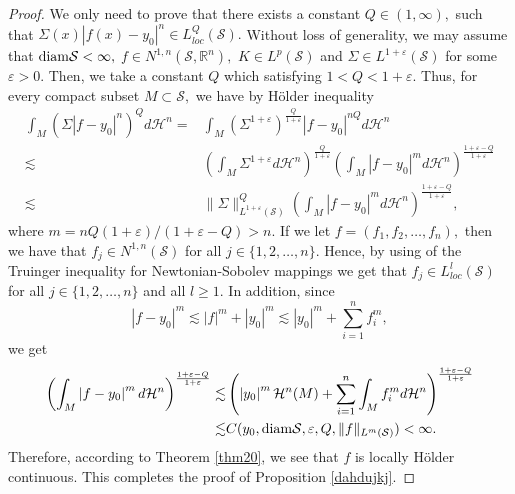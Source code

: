 \documentclass[11pt,twoside]{article}
\theoremstyle{definition}
\theoremstyle{remark}
\newcommand{\abs}[1]{\left|#1\right|}
\newcommand{\aleq}{\lesssim}
\begin{document}
\begin{proof}
We only need to prove that there exists a constant $Q\in(1,\infty),$ such that  $\Sigma(x)\abs{f(x)-y_{0}}^{n}\in L_{loc}^{Q}(\mathcal{S}).$ Without loss of generality, we may assume that ${\rm diam}\mathcal{S}<\infty,$ $f\in N^{1,n}(\mathcal{S},\mathbb{R}^{n}),$ $K\in L^{p}(\mathcal{S})$ and  $\Sigma\in L^{1+\varepsilon}(\mathcal{S})$ for some $\varepsilon>0.$ Then, we take a constant $Q$ which satisfying $1<Q<1+\varepsilon.$
Thus, for every compact subset $M\subset \mathcal{S},$ we have by H\"{o}lder inequality
\begin{equation}
\begin{aligned}
\int_{M}\left(\Sigma\abs{f-y_{0}}^{n}\right)^{Q}d\mathcal{H}^{n}=&\int_{M}(\Sigma^{1+\varepsilon})^{\frac{Q}{1+\varepsilon}}\abs{f-y_{0}}^{nQ}d\mathcal{H}^{n}\\
\aleq&\left(\int_{M}\Sigma^{1+\varepsilon}d\mathcal{H}^{n}\right)^{\frac{Q}{1+\varepsilon}}\left(\int_{M}\abs{f-y_{0}}^{m}d\mathcal{H}^{n}\right)^{\frac{1+\varepsilon-Q}{1+\varepsilon}}\\
\aleq&\|\Sigma\|_{L^{1+\varepsilon}(\mathcal{S})}^{Q}\left(\int_{M}\abs{f-y_{0}}^{m}d\mathcal{H}^{n}\right)^{\frac{1+\varepsilon-Q}{1+\varepsilon}},
\end{aligned}
\end{equation}
where $m=nQ(1+\varepsilon)/(1+\varepsilon-Q)>n.$ If we let $f=(f_{1},f_{2},\ldots,f_{n}),$ then we have that $f_{j}\in N^{1,n}(\mathcal{S})$ for all $j\in\{1,2,\ldots,n\}.$ Hence, by using of the Truinger inequality
\cite[Theorem 6.1]{HK00} for Newtonian-Sobolev mappings we get that $f_{j}\in L_{loc}^{l}(\mathcal{S})$ for all $j\in\{1,2,\ldots,n\}$ and all $l\geq1.$ In addition, since
$$
\abs{f-y_{0}}^{m}\aleq\abs{f}^{m}+\abs{y_{0}}^{m}\aleq \abs{y_{0}}^{m}+\sum_{i=1}^{n}f_{i}^{m},
$$
we get 
\begin{equation}
\begin{aligned}
\left(\int_{M}\abs{f-y_{0}}^{m}d\mathcal{H}^{n}\right)^{\frac{1+\varepsilon-Q}{1+\varepsilon}}\aleq&\left(\abs{y_{0}}^{m}\mathcal{H}^{n}(M)+
\sum_{i=1}^{n}\int_{M}f_{i}^{m}d\mathcal{H}^{n}\right)^{\frac{1+\varepsilon-Q}{1+\varepsilon}}\\
\aleq&C(y_{0},{\rm diam}\mathcal{S},\varepsilon,Q,\|f\|_{L^{m}(\mathcal{S})})<\infty.
\end{aligned}
\end{equation}
Therefore, according to Theorem \ref{thm20}, we see that  $f$ is locally H\"{o}lder continuous. This completes the proof of Proposition \ref{dahdujkj}.
\end{proof}
\end{document}
